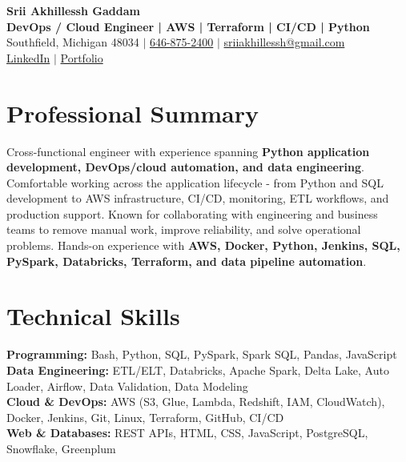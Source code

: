 \documentclass[letterpaper,10pt]{article}
\begin{document}
\fontsize{9.35pt}{10.45pt}\selectfont

\begin{center}
    {\LARGE \textbf{Srii Akhillessh Gaddam}} \\[-1pt]
    \textbf{DevOps / Cloud Engineer | AWS | Terraform | CI/CD | Python} \\[2pt]
    Southfield, Michigan 48034 $|$
    \href{tel:6468752400}{646-875-2400} $|$
    \href{mailto:sriiakhillessh@gmail.com}{sriiakhillessh@gmail.com} \\[1pt]
    \href{https://www.linkedin.com/in/srii-akhiilessh-gaddam-b48668191/}{LinkedIn} $|$
    \href{https://sriiakhillesshg.github.io/portfolio/}{Portfolio}
\end{center}
\vspace{-8pt}

\section{Professional Summary}
\small{Cross-functional engineer with experience spanning \textbf{Python application development, DevOps/cloud automation, and data engineering}. Comfortable working across the application lifecycle - from Python and SQL development to AWS infrastructure, CI/CD, monitoring, ETL workflows, and production support. Known for collaborating with engineering and business teams to remove manual work, improve reliability, and solve operational problems. Hands-on experience with \textbf{AWS, Docker, Python, Jenkins, SQL, PySpark, Databricks, Terraform, and data pipeline automation}.}

\section{Technical Skills}
\small{
\textbf{Programming:} Bash, Python, SQL, PySpark, Spark SQL, Pandas, JavaScript \\
\textbf{Data Engineering:} ETL/ELT, Databricks, Apache Spark, Delta Lake, Auto Loader, Airflow, Data Validation, Data Modeling \\
\textbf{Cloud \& DevOps:} AWS (S3, Glue, Lambda, Redshift, IAM, CloudWatch), Docker, Jenkins, Git, Linux, Terraform, GitHub, CI/CD \\
\textbf{Web \& Databases:} REST APIs, HTML, CSS, JavaScript, PostgreSQL, Snowflake, Greenplum
}
\end{document}
